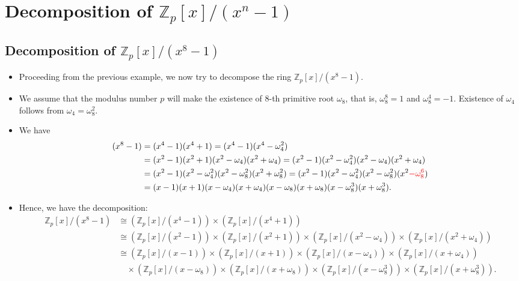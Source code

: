 \section{Decomposition of \( \mathbb{Z}_{p}[x]/(x^{n}-1) \)}
\subsection{Decomposition of \( \mathbb{Z}_{p}[x]/(x^{8}-1) \)}
\begin{frame}
    \begin{itemize}
        \item Proceeding from the previous example, we now try to decompose the ring 
            \( \mathbb{Z}_{p}[x]/(x^{8}-1) \).
        \item We assume that the modulus number \( p \) will make the existence of 
            8-th primitive root \( \omega_{8} \), that is, \( \omega_{8}^{8} = 1 \) and
            \( \omega_{8}^{4} =  -1 \). 
            Existence of \( \omega_{4} \) follows from \( \omega_{4} = \omega_{8}^{2} \).
        \item We have
            \begin{align*}
                (x^{8}-1) &= (x^{4}-1)(x^{4}+1) = (x^{4} -1)(x^{4} - \omega_{4}^{2})\\
                          &= (x^{2}-1)(x^{2}+1)(x^{2} - \omega_{4})(x^{2} + \omega_{4})
                           = (x^{2}-1)  (x^{2}-\omega_{4}^{2})  (x^{2} - \omega_{4})(x^{2} + \omega_{4})\\
                          &= (x^{2}-1)(x^{2} - \omega_{4}^{2})(x^{2} - \omega_{8}^{2})(x^{2} + \omega_{8}^{2})
                          = (x^{2}-1)(x^{2} - \omega_{4}^{2})(x^{2} - \omega_{8}^{2})(x^{2} {\color{red}- \omega_{8}^{6}})\\
                          &= (x - 1)(x + 1)
                             (x - \omega_{4})(x + \omega_{4})
                             (x - \omega_{8})(x + \omega_{8})
                             (x - \omega_{8}^{3})(x + \omega_{8}^{3}).
            \end{align*}
        \item Hence, we have the decomposition:
\begin{align*}
\mathbb{Z}_{p}[x]/(x^{8}-1)
&\cong (\mathbb{Z}_{p}[x]/(x^{4}-1))
        \times
        (\mathbb{Z}_{p}[x]/(x^{4}+1)) \\[6pt]
&\cong (\mathbb{Z}_{p}[x]/(x^{2}-1))
        \times
        (\mathbb{Z}_{p}[x]/(x^{2}+1))
        \times
        (\mathbb{Z}_{p}[x]/(x^{2}-\omega_{4}))
        \times
        (\mathbb{Z}_{p}[x]/(x^{2}+\omega_{4})) \\[6pt]
&\cong (\mathbb{Z}_{p}[x]/(x-1))
        \times
        (\mathbb{Z}_{p}[x]/(x+1))
        \times
        (\mathbb{Z}_{p}[x]/(x-\omega_{4}))
        \times
        (\mathbb{Z}_{p}[x]/(x+\omega_{4})) \\[3pt]
&\quad\times (\mathbb{Z}_{p}[x]/(x-\omega_{8}))
        \times
        (\mathbb{Z}_{p}[x]/(x+\omega_{8}))
        \times
        (\mathbb{Z}_{p}[x]/(x-\omega_{8}^{3}))
        \times
        (\mathbb{Z}_{p}[x]/(x+\omega_{8}^{3})).
\end{align*}
    \end{itemize}
\end{frame}

